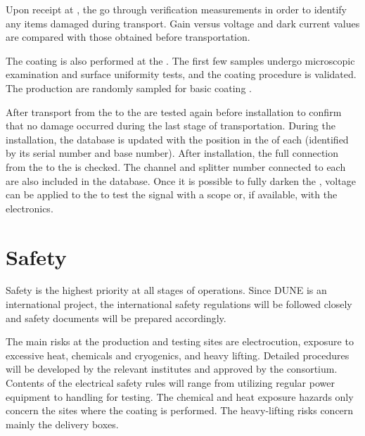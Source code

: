 Upon receipt at , the  go through verification measurements in order to identify any items damaged during transport.  Gain versus voltage and dark current values are compared with those obtained before transportation.

The  coating is also performed at the . The first few samples undergo microscopic examination and surface uniformity tests, and the coating procedure is validated. The production  are randomly sampled for basic coating .

After  transport from the  to \surf the  are tested again before installation to confirm that no damage occurred during the last stage of transportation. During the installation, the  database is updated with the position in the  of each  (identified by its serial number and base number). After installation, the full connection from the  to the  is checked. The  channel and splitter number connected to each  are also included in the  database. %
Once it is possible to fully darken the , voltage can be applied to the  to test the signal with a scope or, if available, with the  electronics.

\section{Safety}
\label{sec:fddp-pd-11}

Safety is the highest priority at all stages of \dual {} operations. Since DUNE is an international project, the international safety regulations will be followed closely %
and safety documents will be prepared accordingly.

The main risks at the production and testing sites are electrocution, exposure to excessive heat, chemicals and cryogenics, and heavy lifting. Detailed procedures will be developed by the relevant institutes and approved by the \dual {} consortium. Contents of the electrical safety rules will range from utilizing regular power equipment to handling  for testing. The chemical and heat exposure hazards only concern the sites where the  coating is performed. The heavy-lifting risks concern mainly %
the  delivery boxes.

